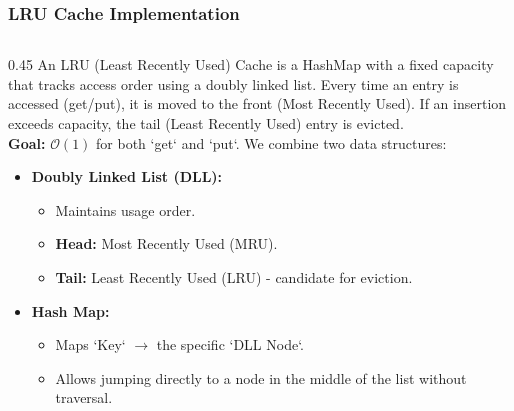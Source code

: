 \documentclass[8pt,aspectratio=169]{beamer}
\begin{document}
\begin{frame}[fragile]
\frametitle{LRU Cache Implementation}
\begin{columns}[T]
    \begin{column}{0.45\textwidth}
    	    An LRU (Least Recently Used) Cache is a HashMap with a fixed capacity that tracks access order using a doubly linked list. Every time an entry is accessed (get/put), it is moved to the front (Most Recently Used). If an insertion exceeds capacity, the tail (Least Recently Used) entry is evicted. \\
        \textbf{Goal:} $\mathcal{O}(1)$ for both `get` and `put`.
        \vspace{0.5em}
        We combine two data structures:
        \begin{itemize}
            \item \textbf{Doubly Linked List (DLL):}
            \begin{itemize}
                \item Maintains usage order.
                \item \textbf{Head:} Most Recently Used (MRU).
                \item \textbf{Tail:} Least Recently Used (LRU) - candidate for eviction.
            \end{itemize}
            \item \textbf{Hash Map:}
            \begin{itemize}
                \item Maps `Key` $\to$ the specific `DLL Node`.
                \item Allows jumping directly to a node in the middle of the list without traversal.
            \end{itemize}
        \end{itemize}
    \end{column}


\end{columns}
\end{frame}
\end{document}
